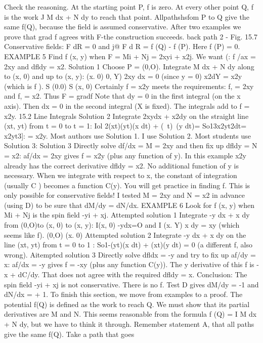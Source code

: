 Check the reasoning. At the starting point P, f is zero. At every other point Q, f is
the work J M dx + N dy to reach that point. Allpathshsfom P to Q give the same f(Q),
because the field is assumed conservative. After two examples we prove that grad f
agrees with F-the construction succeeds.
back path 2 -
Fig. 15.7 Conservative fields:  F dR = 0 and j@ F d R = f (Q) - f (P). Here f (P) = 0.
EXAMPLE 5 Find f (x, y) when F = Mi + Nj = 2xyi + x2j. We want (: f /ax = 2xy
and dfldy = x2.
Solution 1 Choose P = (0,O). Integrate M dx + N dy along to (x, 0) and up to (x, y):
(x. 0) 0, Y)
2xy dx = 0 (since y = 0) x2dY = x2y (which is f ). S (0.0) S (x, 0)
Certainly f = x2y meets the requirements: f, = 2xy and f, = x2. Thus F = gradf Note
that dy = 0 in the first integral (on the x axis). Then dx = 0 in the second integral
(X is fixed). The integrals add to f = x2y. 
15.2 Line Integrals
Solution 2 Integrate 2xydx + x2dy on the straight line (xt, yt) from t = 0 to t = 1:
Iol 2(xt)(yt)(x dt) + (~t)~(y dt)= So13x2yt2dt= x2yt3]: = x2y.
Most authors use Solution 1. I use Solution 2. Most students use Solution 3:
Solution 3 Directly solve df/dx = M = 2xy and then fix up dfldy = N = x2:
af/dx = 2xy gives f = x2y (plus any function of y).
In this example x2y already has the correct derivative dfldy = x2. No additional
function of y is necessary. When we integrate with respect to x, the constant of
integration (usually C ) becomes a function C(y).
You will get practice in finding f. This is only possible for conservative fields! I
tested M = 2xy and N = x2 in advance (using D) to be sure that dM/dy = dN/dx.
EXAMPLE 6 Look for f (x, y) when Mi + Nj is the spin field -yi + xj.
Attempted solution 1 Integrate -y dx + x dy from (0,O)to (x, 0) to (x, y):
I(x, 0)
-ydx=O and I
(x. Y)
x dy = xy (which seems like f).
(0,O) (x. 0)
Attempted solution 2 Integrate -y dx + x dy on the line (xt, yt) from t = 0 to 1 :
So1-(yt)(x dt) + (xt)(y dt) = 0 (a different f, also wrong).
Aitempted solution 3 Directly solve dfldx = -y and try to fix up af/dy = x:
af/dx = -y gives f = -xy (plus any function C(y)).
The y derivative of this f is -x + dC/dy. That does not agree with the required
dfldy = x. Conclusion: The spin field -yi + xj is not conservative. There is no f.
Test D gives dM/dy = -1 and dN/dx = + 1.
To finish this section, we move from examples to a proof. The potential f(Q) is
defined as the work to reach Q. We must show that its partial derivatives are M and
N. This seems reasonable from the formula f (Q) = I M dx + N dy, but we have to
think it through.
Remember statement A, that all paths give the same f(Q). Take a path that goes
